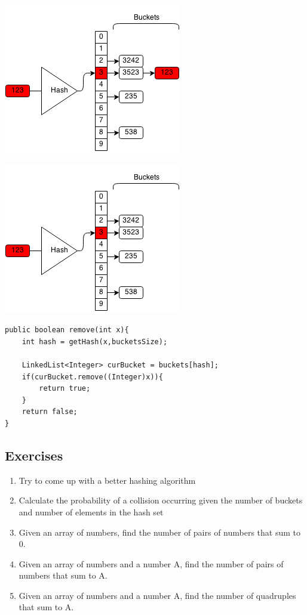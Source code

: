 \documentclass[11pt,oneside]{book}
\makeatletter
\def\maxwidth#1{\ifdim\Gin@nat@width>#1 #1\else\Gin@nat@width\fi}
\makeatother
\begin{document}
\includegraphics[width=\maxwidth{\textwidth}]{hashsetrem2.png}

\includegraphics[width=\maxwidth{\textwidth}]{hashsetrem3.png}

\begin{lstlisting}
public boolean remove(int x){
    int hash = getHash(x,bucketsSize);
    
    LinkedList<Integer> curBucket = buckets[hash];
    if(curBucket.remove((Integer)x)){
        return true;
    }
    return false;
}
\end{lstlisting}

\subsection{Exercises}

\begin{enumerate}
\item Try to come up with a better hashing algorithm
\item Calculate the probability of a collision occurring given the number of buckets and number of elements in the hash set
\item Given an array of numbers, find the number of pairs of numbers that sum to 0.
\item Given an array of numbers and a number A, find the number of pairs of numbers that sum to A.
\item Given an array of numbers and a number A, find the number of quadruples that sum to A.
\end{enumerate}
\end{document}

